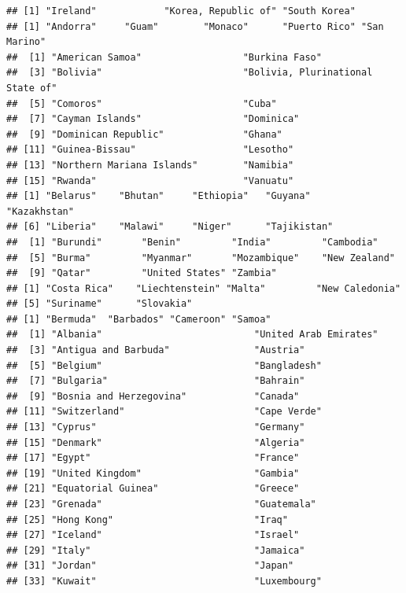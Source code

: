 \documentclass[]{article}
\begin{document}
\begin{verbatim}
## [1] "Ireland"            "Korea, Republic of" "South Korea"       
## [1] "Andorra"     "Guam"        "Monaco"      "Puerto Rico" "San Marino" 
##  [1] "American Samoa"                  "Burkina Faso"                   
##  [3] "Bolivia"                         "Bolivia, Plurinational State of"
##  [5] "Comoros"                         "Cuba"                           
##  [7] "Cayman Islands"                  "Dominica"                       
##  [9] "Dominican Republic"              "Ghana"                          
## [11] "Guinea-Bissau"                   "Lesotho"                        
## [13] "Northern Mariana Islands"        "Namibia"                        
## [15] "Rwanda"                          "Vanuatu"                        
## [1] "Belarus"    "Bhutan"     "Ethiopia"   "Guyana"     "Kazakhstan"
## [6] "Liberia"    "Malawi"     "Niger"      "Tajikistan"
##  [1] "Burundi"       "Benin"         "India"         "Cambodia"     
##  [5] "Burma"         "Myanmar"       "Mozambique"    "New Zealand"  
##  [9] "Qatar"         "United States" "Zambia"       
## [1] "Costa Rica"    "Liechtenstein" "Malta"         "New Caledonia"
## [5] "Suriname"      "Slovakia"     
## [1] "Bermuda"  "Barbados" "Cameroon" "Samoa"   
##  [1] "Albania"                           "United Arab Emirates"             
##  [3] "Antigua and Barbuda"               "Austria"                          
##  [5] "Belgium"                           "Bangladesh"                       
##  [7] "Bulgaria"                          "Bahrain"                          
##  [9] "Bosnia and Herzegovina"            "Canada"                           
## [11] "Switzerland"                       "Cape Verde"                       
## [13] "Cyprus"                            "Germany"                          
## [15] "Denmark"                           "Algeria"                          
## [17] "Egypt"                             "France"                           
## [19] "United Kingdom"                    "Gambia"                           
## [21] "Equatorial Guinea"                 "Greece"                           
## [23] "Grenada"                           "Guatemala"                        
## [25] "Hong Kong"                         "Iraq"                             
## [27] "Iceland"                           "Israel"                           
## [29] "Italy"                             "Jamaica"                          
## [31] "Jordan"                            "Japan"                            
## [33] "Kuwait"                            "Luxembourg"                       

\end{verbatim}
\end{document}
